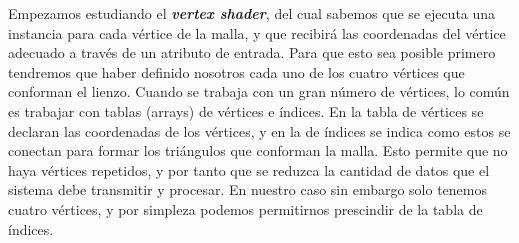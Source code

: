 

Empezamos estudiando el \textbf{\textit{vertex shader}}, del cual sabemos que se ejecuta una instancia para cada vértice de la malla, y que recibirá las coordenadas del vértice adecuado a través de un atributo de entrada. Para que esto sea posible primero tendremos que haber definido nosotros cada uno de los cuatro vértices que conforman el lienzo. Cuando se trabaja con un gran número de vértices, lo común es trabajar con tablas (arrays) de vértices e índices. En la tabla de vértices se declaran las coordenadas de los vértices, y en la de índices se indica como estos se conectan para formar los triángulos que conforman la malla. Esto permite que no haya vértices repetidos, y por tanto que se reduzca la cantidad de datos que el sistema debe transmitir y procesar. En nuestro caso sin embargo solo tenemos cuatro vértices, y por simpleza podemos permitirnos prescindir de la tabla de índices.\newline

